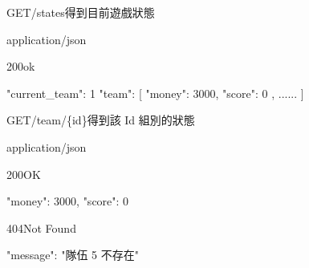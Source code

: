 \documentclass[12pt]{NGPLB}
\begin{document}
\begin{apiRoute}{GET}{/states}{得到目前遊戲狀態}
\begin{routeParameter}
\end{routeParameter}
\begin{routeResponse}{application/json}
\begin{routeResponseItem}{200}{ok}
\begin{routeResponseItemBody}
{
	"current\_team": 1
	"team": [
		{
		"money": 3000,
		"score": 0	
		},
		......
	]
}
\end{routeResponseItemBody}
\end{routeResponseItem}
\end{routeResponse}
\end{apiRoute}

\begin{apiRoute}{GET}{/team/\{id\}}{得到該 Id 組別的狀態}
\begin{routeParameter}
\end{routeParameter}
\begin{routeResponse}{application/json}
\begin{routeResponseItem}{200}{OK}
\begin{routeResponseItemBody}
{
    "money": 3000,
    "score": 0
}
\end{routeResponseItemBody}
\end{routeResponseItem}

\begin{routeResponseItem}{404}{Not Found}
\begin{routeResponseItemBody}
{
    "message": "隊伍 5 不存在"
}
\end{routeResponseItemBody}
\end{routeResponseItem}
\end{routeResponse}
\end{apiRoute}
\end{document}
